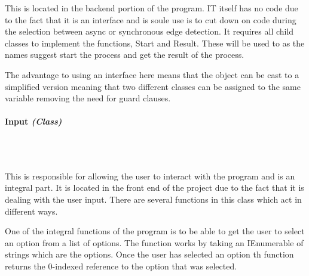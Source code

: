 \begin{FlushLeft}
    This is located in the backend portion of the program. IT itself has no code due to the fact that it is an interface and is soule use is to cut down on code during the selection between async or synchronous edge detection. It requires all child classes to implement the functions, Start and Result. These will be used to as the names suggest start the process and get the result of the process. \\ \bk

    The advantage to using an interface here means that the object can be cast to a simplified version meaning that two different classes can be assigned to the same variable removing the need for guard clauses. \\
    \bk

    \pagebreak
    \paragraph{Input \textit{(Class)}} \mbox{} \\

    \begin{figure}[H]
        \centering
    \end{figure}\\

    This is responsible for allowing the user to interact with the program and is an integral part. It is located in the front end of the project due to the fact that it is dealing with the user input. There are several functions in this class which act in different ways. \\ \bk

    One of the integral functions of the program is to be able to get the user to select an option from a list of options. The function works by taking an IEnumerable of strings which are the options. Once the user has selected an option th function returns the 0-indexed reference to the option that was selected. \\ \bk


\end{FlushLeft}
